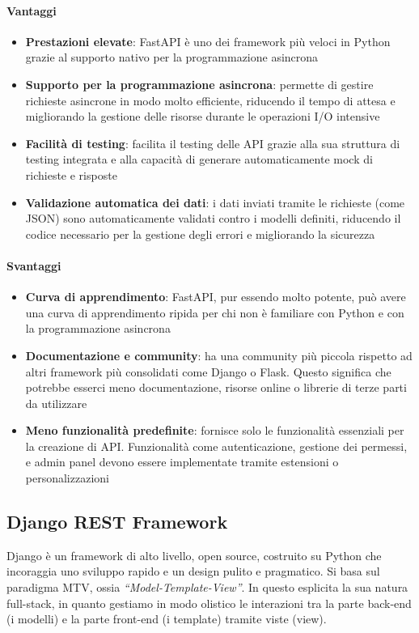 \documentclass{article}
\begin{document}
\paragraph*{Vantaggi}
\begin{itemize}
    \item \textbf{Prestazioni elevate}: FastAPI è uno dei framework 
    più veloci in Python grazie al supporto nativo per la programmazione 
    asincrona
    \item \textbf{Supporto per la programmazione asincrona}: permette 
    di gestire richieste asincrone in modo molto efficiente, riducendo 
    il tempo di attesa e migliorando la gestione delle risorse durante 
    le operazioni I/O intensive
    \item \textbf{Facilità di testing}: facilita il testing delle API 
    grazie alla sua struttura di testing integrata e alla capacità di 
    generare automaticamente mock di richieste e risposte
    \item \textbf{Validazione automatica dei dati}: i dati inviati 
    tramite le richieste (come JSON) sono automaticamente validati 
    contro i modelli definiti, riducendo il codice necessario per la 
    gestione degli errori e migliorando la sicurezza
\end{itemize}
\paragraph*{Svantaggi}
\begin{itemize}
    \item \textbf{Curva di apprendimento}: FastAPI, pur essendo molto 
    potente, può avere una curva di apprendimento ripida per chi non è 
    familiare con Python e con la programmazione asincrona
    \item \textbf{Documentazione e community}: ha una community più 
    piccola rispetto ad altri framework più consolidati come Django o 
    Flask. Questo significa che potrebbe esserci meno documentazione, 
    risorse online o librerie di terze parti da utilizzare
    \item \textbf{Meno funzionalità predefinite}: fornisce solo le 
    funzionalità essenziali per la creazione di API. Funzionalità come 
    autenticazione, gestione dei permessi, e admin panel devono essere 
    implementate tramite estensioni o personalizzazioni
\end{itemize}

\subsection{Django REST Framework}
Django è un framework di alto livello, open source, costruito su Python 
che incoraggia uno sviluppo rapido e un design pulito e pragmatico. 
Si basa sul paradigma MTV, ossia \textit{“Model-Template-View”}. In 
questo esplicita la sua natura full-stack, in quanto gestiamo in modo 
olistico le interazioni tra la parte back-end (i modelli) e la parte 
front-end (i template) tramite viste (view).
\end{document}
